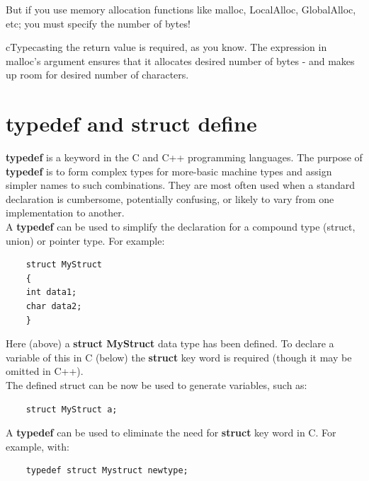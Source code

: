 	
	But if you use memory allocation functions like malloc, LocalAlloc, GlobalAlloc, etc; you must specify the number of bytes!\\
	
	
	cTypecasting the return value is required, as you know. The expression in malloc's argument ensures that it allocates desired number of bytes - and makes up room for desired number of characters.
	
	
	\section{typedef and struct define}
	\textbf{typedef} is a keyword in the C and C++ programming languages. The purpose of \textbf{typedef} is to form complex types for more-basic machine types and assign simpler names to such combinations. They are most often used when a standard declaration is cumbersome, potentially confusing, or likely to vary from one implementation to another.\\
	
	A \textbf{typedef} can be used to simplify the declaration for a compound type (struct, union) or pointer type. For example:\\
	
	\begin{verbatim}
	struct MyStruct
	{
	int data1;
	char data2;
	}
	\end{verbatim}
	
	Here (above) a \textbf{struct MyStruct} data type has been defined. To declare a variable of this in C (below) the \textbf{struct} key word is required (though it may be omitted in C++).\\
	
	The defined struct can be now be used to generate variables, such as:\\
	\begin{verbatim}
	struct MyStruct a;
	\end{verbatim}
	
	A \textbf{typedef} can be used to eliminate the need for \textbf{struct} key word in C. For example, with:
	\begin{verbatim}
	typedef struct Mystruct newtype;
	\end{verbatim}
	
